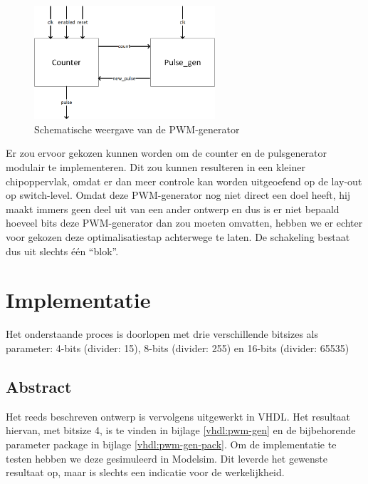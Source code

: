 \documentclass{article}
\begin{document}
\begin{figure}[H]
	\centering
	\includegraphics[width=0.6\textwidth]{resource/pwm_gen.png}
	\caption{Schematische weergave van de PWM-generator}
	\label{fig:pwm-schem}
\end{figure}

Er zou ervoor gekozen kunnen worden om de counter en de pulsgenerator modulair te implementeren. Dit zou kunnen resulteren in een kleiner chipoppervlak, omdat er dan meer controle kan worden uitgeoefend op de lay-out op switch-level. Omdat deze PWM-generator nog niet direct een doel heeft, hij maakt immers geen deel uit van een ander ontwerp en dus is er niet bepaald hoeveel bits deze PWM-generator dan zou moeten omvatten, hebben we er echter voor gekozen deze optimalisatiestap achterwege te laten. 
De schakeling bestaat dus uit slechts één ``blok''.

\section{Implementatie}
\label{sec:pwm-impl}
\footnotesize
Het onderstaande proces is doorlopen met drie verschillende bitsizes als parameter: 4-bits (divider: 15), 8-bits (divider: 255) en 16-bits (divider: 65535)

\normalsize
\subsection{Abstract}
\label{ssec:pwm-impl-abstr}
Het reeds beschreven ontwerp is vervolgens uitgewerkt in VHDL. Het resultaat hiervan, met bitsize 4, is te vinden in bijlage \ref{vhdl:pwm-gen} en de bijbehorende parameter package in bijlage \ref{vhdl:pwm-gen-pack}. Om de implementatie te testen hebben we deze gesimuleerd in Modelsim. Dit leverde het gewenste resultaat op, maar is slechts een indicatie voor de werkelijkheid.
\end{document}
